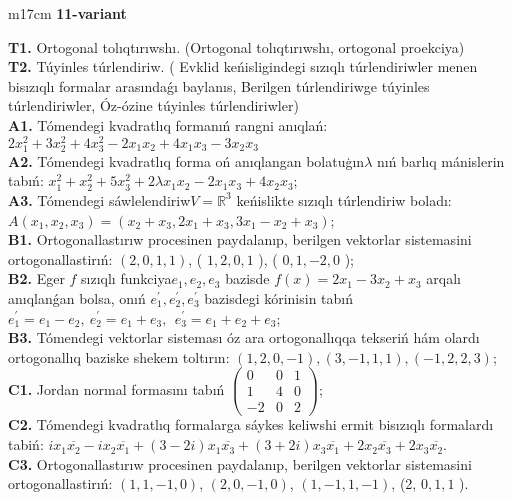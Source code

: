 \documentclass{article}
\begin{document}
\begin{tabular}{m{17cm}}
\textbf{11-variant}
\newline

\textbf{T1.} Ortogonal  tolıqtırıwshı. (Ortogonal tolıqtırıwshı,  ortogonal proekciya) \\
\textbf{T2.} Túyinles túrlendiriw. ( Evklid keńisligindegi sızıqlı túrlendiriwler menen bisızıqlı formalar arasındaǵı baylanıs, Berilgen túrlendiriwge túyinles túrlendiriwler, Óz-ózine túyinles túrlendiriwler) \\
\textbf{A1.} Tómendegi kvadratlıq formanıń rangni anıqlań: \(2x_{1}^{2} + 3x_{2}^{2} + 4x_{3}^{2} - 2x_{1}x_{2} + 4x_{1}x_{3} - 3x_{2}x_{3}\) \\
\textbf{A2.} Tómendegi kvadratlıq forma oń anıqlangan bolatuģın\(\lambda\) nıń barlıq mánislerin tabıń: \(x_{1}^{2} + x_{2}^{2} + 5x_{3}^{2} + 2\lambda x_{1}x_{2} - 2x_{1}x_{3} + 4x_{2}x_{3}\); \\
\textbf{A3.} Tómendegi sáwlelendiriw\(V = \mathbb{R}^{3}\) keńislikte sızıqlı túrlendiriw boladı: \(A\left( x_{1},x_{2},x_{3} \right) = \left( x_{2} + x_{3},2x_{1} + x_{3},3x_{1} - x_{2} + x_{3} \right)\); \\
\textbf{B1.} Ortogonallastırıw procesinen paydalanıp, berilgen vektorlar sistemasini ortogonallastirıń: \((2,0,1,1)\), ( \(1,2,0,1\) ), ( \(0,1, - 2,0\) ); \\
\textbf{B2.} Eger \(f\) sızıqlı funkciya\(e_{1},e_{2},e_{3}\) bazisde \(f(x) = 2x_{1} - 3x_{2} + x_{3}\) arqalı anıqlanǵan bolsa, onıń \(e_{1}^{'},e_{2}^{'},e_{3}^{'}\) bazisdegi kórinisin tabıń\(e_{1}^{'} = e_{1} - e_{2},\ e_{2}^{'} = e_{1} + e_{3},\ \ e_{3}^{'} = e_{1} + e_{2} + e_{3}\); \\
\textbf{B3.} Tómendegi vektorlar sisteması óz ara ortogonallıqqa tekseriń hám olardı ortogonallıq baziske shekem toltırın: \((1,2,0, - 1),(3, - 1,1,1),( - 1,2,2,3)\); \\
\textbf{C1.} Jordan normal formasını tabıń \(\begin{pmatrix} 0 & 0 & 1 \\ 1 & 4 & 0 \\  - 2 & 0 & 2 \end{pmatrix}\); \\
\textbf{C2.} Tómendegi kvadratlıq formalarga sáykes keliwshi ermit bisızıqlı formalardı tabiń: \(ix_{1}\overline{x_{2}} - ix_{2}\overline{x_{1}} + (3 - 2i)x_{1}\overline{x_{3}} + (3 + 2i)x_{3}\overline{x_{1}} + 2x_{2}\overline{x_{3}} + 2x_{3}\overline{x_{2}}\). \\
\textbf{C3.} Ortogonallastırıw procesinen paydalanıp, berilgen vektorlar sistemasini ortogonallastirıń: \((1,1, - 1,0)\), \((2,0, - 1,0)\), \((1, - 1,1, - 1)\), (2, \(0,1,1\) ). \\

\end{tabular}
\vspace{1cm}
\end{document}

